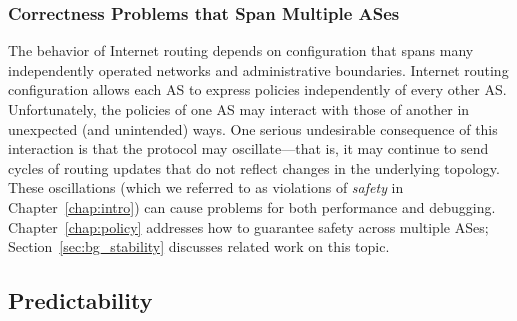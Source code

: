 



\subsubsection{Correctness Problems that Span Multiple ASes}

The behavior of Internet routing depends on configuration that spans
many independently operated networks and administrative boundaries.
Internet routing configuration allows each AS to express policies
independently of every other AS.  Unfortunately, the policies of one AS
may interact with those of another in unexpected (and unintended) ways.
One serious undesirable consequence of this interaction is that the
protocol may oscillate---that is, it may continue to send cycles of
routing updates that do not reflect changes in the underlying
topology.  These oscillations (which we referred to as violations of
{\em safety} in Chapter~\ref{chap:intro}) can cause problems for both
performance and debugging.  Chapter~\ref{chap:policy} addresses how to
guarantee safety across multiple ASes; Section~\ref{sec:bg_stability}
discusses related work on this topic.

\subsection{Predictability}
\label{sec:te_related}








